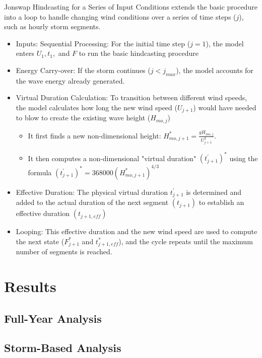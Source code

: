 \documentclass[11pt,a4paper]{article}
\begin{document}
Jonswap Hindcasting for a Series of Input Conditions  extends the basic procedure into a loop to handle changing wind conditions over a series of time steps ($j$), such as hourly storm segments.

\begin{itemize}
  \item Inputs: Sequential Processing: For the initial time step ($j=1$), the model enters $U_1, t_1,$ and $F$ to run the basic hindcasting procedure
  \item Energy Carry-over: If the storm continues ($j < j_{max}$), the model accounts for the wave energy already generated.
  \item Virtual Duration Calculation: To transition between different wind speeds, the model calculates how long the new wind speed ($U_{j+1}$) would have needed to blow to create the existing wave height ($H_{mo,j}$)
  \begin{itemize}
    \item It first finds a new non-dimensional height: $H_{mo, j+1}^* = \frac{gH_{mo,j}}{U_{j+1}^2}$.
    \item It then computes a non-dimensional "virtual duration" $(t_{j+1}^{\prime})^{*}$ using the formula $(t_{j+1}^{\prime})^{*}=368000(H_{mo,j+1}^{*})^{4/3}$

  \end{itemize}
  \item Effective Duration: The physical virtual duration $t_{j+1}^{\prime}$ is determined and added to the actual duration of the next segment $(t_{j+1})$ to establish an effective duration $(t_{j+1,eff})$
  \item Looping: This effective duration and the new wind speed are used to compute the next state  ($F^*_{j+1}$ and $t^*_{j+1,eff}$), and the cycle repeats until the maximum number of segments is reached.
\end{itemize}

 
\newpage

\section{Results}
\subsection{Full-Year Analysis}


\subsection{Storm-Based Analysis}
\end{document}
